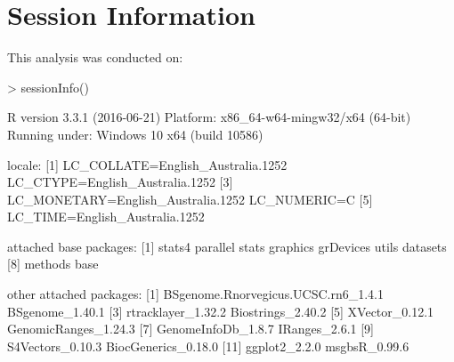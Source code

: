 \documentclass{article}
\begin{document}
\section{Session Information}
This analysis was conducted on:
\begin{Schunk}
\begin{Sinput}
> sessionInfo()
\end{Sinput}
\begin{Soutput}
R version 3.3.1 (2016-06-21)
Platform: x86_64-w64-mingw32/x64 (64-bit)
Running under: Windows 10 x64 (build 10586)

locale:
[1] LC_COLLATE=English_Australia.1252  LC_CTYPE=English_Australia.1252   
[3] LC_MONETARY=English_Australia.1252 LC_NUMERIC=C                      
[5] LC_TIME=English_Australia.1252    

attached base packages:
[1] stats4    parallel  stats     graphics  grDevices utils     datasets 
[8] methods   base     

other attached packages:
 [1] BSgenome.Rnorvegicus.UCSC.rn6_1.4.1 BSgenome_1.40.1                    
 [3] rtracklayer_1.32.2                  Biostrings_2.40.2                  
 [5] XVector_0.12.1                      GenomicRanges_1.24.3               
 [7] GenomeInfoDb_1.8.7                  IRanges_2.6.1                      
 [9] S4Vectors_0.10.3                    BiocGenerics_0.18.0                
[11] ggplot2_2.2.0                       msgbsR_0.99.6                      


\end{Soutput}
\end{Schunk}
\end{document}
